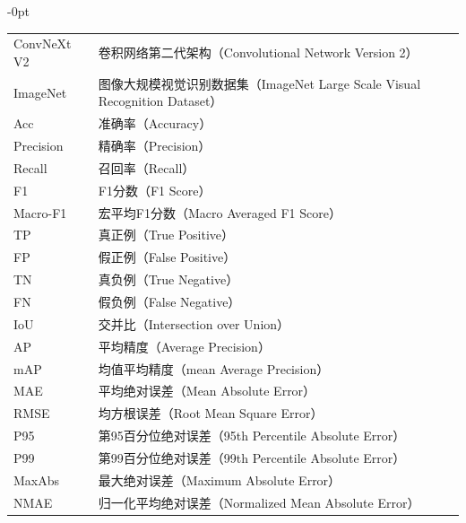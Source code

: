 \begin{signAndABC}
\begin{adjustwidth}{-\leftskip}{0pt}
\begin{longtable}{l@{\hspace{4em}}p{10.5cm}}
            ConvNeXt V2     & 卷积网络第二代架构（Convolutional Network Version 2）            \\
            ImageNet        & 图像大规模视觉识别数据集（ImageNet Large Scale Visual Recognition Dataset） \\
            Acc             & 准确率（Accuracy）                                            \\
            Precision       & 精确率（Precision）                                           \\
            Recall          & 召回率（Recall）                                              \\
            F1              & F1分数（F1 Score）                                            \\
            Macro-F1        & 宏平均F1分数（Macro Averaged F1 Score）                        \\
            TP              & 真正例（True Positive）                                       \\
            FP              & 假正例（False Positive）                                      \\
            TN              & 真负例（True Negative）                                       \\
            FN              & 假负例（False Negative）                                      \\
            IoU             & 交并比（Intersection over Union）                             \\
            AP              & 平均精度（Average Precision）                                  \\
            mAP             & 均值平均精度（mean Average Precision）                         \\
            MAE             & 平均绝对误差（Mean Absolute Error）                            \\
            RMSE            & 均方根误差（Root Mean Square Error）                          \\
            P95             & 第95百分位绝对误差（95th Percentile Absolute Error）             \\
            P99             & 第99百分位绝对误差（99th Percentile Absolute Error）             \\
            MaxAbs          & 最大绝对误差（Maximum Absolute Error）                         \\
            NMAE            & 归一化平均绝对误差（Normalized Mean Absolute Error）              \\

\end{longtable}
\end{adjustwidth}
\end{signAndABC}
